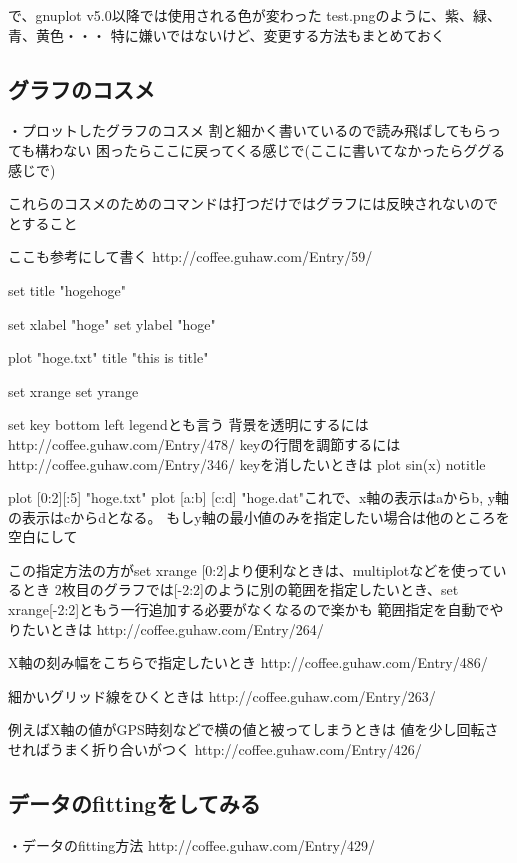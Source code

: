 \documentclass[12pt,a4paper]{jarticle}
\begin{document}
で、gnuplot v5.0以降では使用される色が変わった
test.pngのように、紫、緑、青、黄色・・・
特に嫌いではないけど、変更する方法もまとめておく

\subsection{グラフのコスメ}
・プロットしたグラフのコスメ
割と細かく書いているので読み飛ばしてもらっても構わない
困ったらここに戻ってくる感じで(ここに書いてなかったらググる感じで)

これらのコスメのためのコマンドは打つだけではグラフには反映されないので
とすること

ここも参考にして書く
http://coffee.guhaw.com/Entry/59/

set title "hogehoge"

set xlabel "hoge"
set ylabel "hoge"

plot "hoge.txt" title "this is title"

set xrange
set yrange

set key bottom left
legendとも言う
背景を透明にするには
http://coffee.guhaw.com/Entry/478/
keyの行間を調節するには
http://coffee.guhaw.com/Entry/346/
keyを消したいときは
plot sin(x) notitle


plot [0:2][:5] "hoge.txt"
plot [a:b] [c:d] "hoge.dat"これで、x軸の表示はaからb, y軸の表示はcからdとなる。
もしy軸の最小値のみを指定したい場合は他のところを空白にして

この指定方法の方がset xrange [0:2]より便利なときは、multiplotなどを使っているとき
2枚目のグラフでは[-2:2]のように別の範囲を指定したいとき、set xrange[-2:2]ともう一行追加する必要がなくなるので楽かも
範囲指定を自動でやりたいときは
http://coffee.guhaw.com/Entry/264/

X軸の刻み幅をこちらで指定したいとき
http://coffee.guhaw.com/Entry/486/

細かいグリッド線をひくときは
http://coffee.guhaw.com/Entry/263/


例えばX軸の値がGPS時刻などで横の値と被ってしまうときは
値を少し回転させればうまく折り合いがつく
http://coffee.guhaw.com/Entry/426/

\subsection{データのfittingをしてみる}
・データのfitting方法
http://coffee.guhaw.com/Entry/429/
\end{document}
